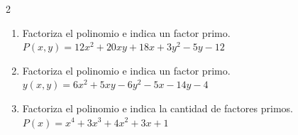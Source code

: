 \documentclass[10pt]{article}
\begin{document}
\begin{multicols}{2}
\begin{enumerate}[label=\textbf{\arabic*.}, itemsep=0.4cm]
			\item Factoriza el polinomio e indica un factor primo. \\
			$P(x, y) = 12x^2 + 20xy + 18x + 3y^2 - 5y - 12$

			\item Factoriza el polinomio e indica un factor primo. \\
			$y(x, y) = 6x^2 + 5xy - 6y^2 - 5x - 14y - 4$

			\item Factoriza el polinomio e indica la cantidad de factores primos. \\
			$P(x) = x^4 + 3x^3 + 4x^2 + 3x + 1$


		\end{enumerate}

\end{multicols}
\end{document}

